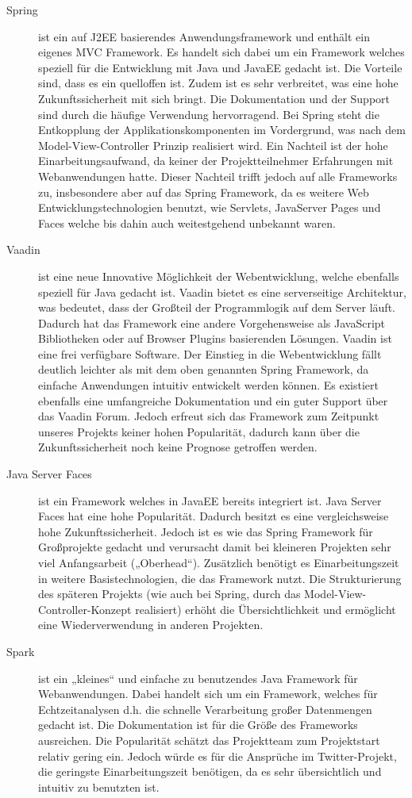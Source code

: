 \begin{description}
	\item [Spring] ist ein auf J2EE basierendes Anwendungsframework und enthält ein eigenes MVC Framework. Es handelt sich dabei um ein Framework welches speziell für die Entwicklung mit Java und JavaEE gedacht ist. Die Vorteile sind, dass es ein quelloffen ist. Zudem ist es sehr verbreitet, was eine hohe Zukunftssicherheit mit sich bringt. Die Dokumentation und der Support sind durch die häufige Verwendung hervorragend. Bei Spring steht die Entkopplung der Applikationskomponenten im Vordergrund, was nach dem Model-View-Controller Prinzip realisiert wird. Ein Nachteil ist der hohe Einarbeitungsaufwand, da keiner der Projektteilnehmer Erfahrungen mit Webanwendungen hatte. Dieser Nachteil trifft jedoch auf alle Frameworks zu, insbesondere aber auf das Spring Framework, da es weitere Web Entwicklungstechnologien benutzt, wie Servlets, JavaServer Pages und Faces welche bis dahin auch weitestgehend unbekannt waren.
	\item [Vaadin] ist eine neue Innovative Möglichkeit der Webentwicklung, welche ebenfalls speziell für Java gedacht ist. Vaadin bietet es eine serverseitige Architektur, was bedeutet, dass der Großteil der Programmlogik auf dem Server läuft. Dadurch hat das Framework eine andere Vorgehensweise als JavaScript Bibliotheken oder auf Browser Plugins basierenden Lösungen. Vaadin ist eine frei verfügbare Software. Der Einstieg in die Webentwicklung fällt deutlich leichter als mit dem oben genannten Spring Framework, da einfache Anwendungen intuitiv entwickelt werden können. Es existiert ebenfalls eine umfangreiche Dokumentation und ein guter Support über das Vaadin Forum. Jedoch erfreut sich das Framework zum Zeitpunkt unseres Projekts keiner hohen Popularität, dadurch kann über die Zukunftssicherheit noch keine Prognose getroffen werden. 
	\item [Java Server Faces] ist ein Framework welches in JavaEE bereits integriert ist. Java Server Faces hat eine hohe Popularität. Dadurch besitzt es eine vergleichsweise hohe Zukunftssicherheit. Jedoch ist es wie das Spring Framework für Großprojekte gedacht und verursacht damit bei kleineren Projekten sehr viel Anfangsarbeit („Oberhead“). Zusätzlich benötigt es Einarbeitungszeit in weitere Basistechnologien, die das Framework nutzt. Die Strukturierung des späteren Projekts (wie auch bei Spring, durch das Model-View-Controller-Konzept realisiert) erhöht die Übersichtlichkeit und ermöglicht eine Wiederverwendung in anderen Projekten.
	\item [Spark] ist ein „kleines“ und einfache zu benutzendes Java Framework für Webanwendungen. Dabei handelt sich um ein Framework, welches für Echtzeitanalysen d.h. die schnelle Verarbeitung großer Datenmengen gedacht ist. Die Dokumentation ist für die Größe des Frameworks ausreichen. Die Popularität schätzt das Projektteam zum Projektstart relativ gering ein. Jedoch würde es für die Ansprüche im Twitter-Projekt, die geringste Einarbeitungszeit benötigen, da es sehr übersichtlich und intuitiv zu benutzten ist. 
\end{description}


